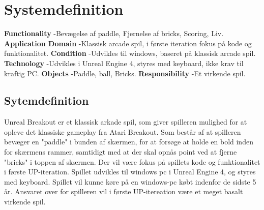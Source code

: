 
\section{Systemdefinition}
\textbf{Functionality}
\newline
-Bevægelse af paddle, Fjernelse af bricks, Scoring, Liv.
\newline
\textbf{Application Domain}
\newline
-Klassisk arcade spil, i første iteration fokus på kode
og funktionalitet.
\newline
\textbf{Condition}\newline
-Udvikles til windows, baseret på klassisk arcade spil.
\newline
\textbf{Technology}\newline
-Udvikles i Unreal Engine 4, styres med keyboard, ikke krav
til kraftig PC.
\newline
\textbf{Objects}\newline
-Paddle, ball, Bricks.
\newline
\textbf{Responsibility}\newline
-Et virkende spil.

\subsection{Sytemdefinition}
Unreal Breakout er et klassisk arkade spil, som giver spilleren mulighed for at opleve det klassiske gameplay fra Atari 
Breakout. Som består af at spilleren bevæger en "paddle" i bunden af skærmen, for at forsøge at holde en bold
inden for skærmens rammer, samtidigt med at der skal opnås point ved at fjerne "bricks" i toppen af skærmen.
Der vil være fokus på spillets kode og funktionalitet i første UP-iteration. Spillet udvikles til windows pc
i Unreal Engine 4, og styres med keyboard. Spillet vil kunne køre på en windows-pc købt indenfor de sidste 5 år.
Ansvaret over for spilleren vil i første UP-itereation være et meget basalt virkende spil.

